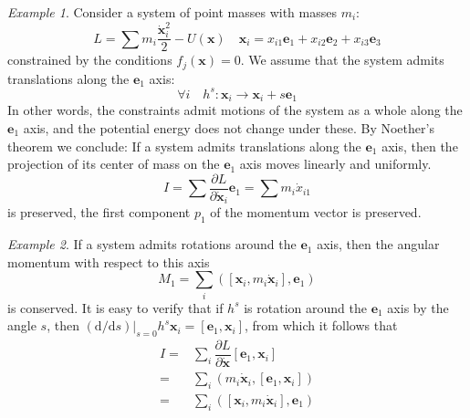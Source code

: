 \documentclass[conference]{IEEEtran}
\theoremstyle{definition}
\theoremstyle{remark}
\newtheorem{exmp}{Example}
\begin{document}
    \begin{exmp}
        Consider a system of point masses with masses $m_i$:
        \begin{equation*}
            L = \sum m_i \dfrac{\dot{\mathbf{x}}_i^2}2 - U(\mathbf{x}) \quad \mathbf{x}_i = x_{i1} \mathbf{e}_1 + x_{i2} \mathbf{e}_2 + x_{i3} \mathbf{e}_3
        \end{equation*}
        constrained by the conditions $f_j(\mathbf{x}) = 0$. We assume that the system admits translations along the $\mathbf{e}_1$ axis:
        \begin{equation*}
            \forall i \quad h^s: \mathbf{x}_i \to \mathbf{x}_i + s \mathbf{e}_1
        \end{equation*}
        In other words, the constraints admit motions of the system as a whole along the $\mathbf{e}_1$ axis, and the potential energy does not change under these. By Noether's theorem we conclude: If a system admits translations along the $\mathbf{e}_1$ axis, then the projection of its center of mass on the $\mathbf{e}_1$ axis moves linearly and uniformly.
        \begin{equation*}
            I = \sum \dfrac{\partial L}{\partial \dot{\mathbf{x}}_i} \mathbf{e}_1 = \sum m_i \dot{x}_{i1}
        \end{equation*}
        is preserved, the first component $p_1$ of the momentum vector is preserved.
    \end{exmp}

    \begin{exmp}
        If a system admits rotations around the $\mathbf{e}_1$ axis, then the angular momentum with respect to this axis
        \begin{equation*}
            M_1 = \sum_i \left( [\mathbf{x}_i, m_i\dot{\mathbf{x}}_i], \mathbf{e}_1 \right)
        \end{equation*}
        is conserved. It is easy to verify that if $h^s$ is rotation around the $\mathbf{e}_1$ axis by the angle $s$, then $(\mathrm{d} / \mathrm{d}s)|_{s = 0} h^s \mathbf{x}_i = [\mathbf{e}_1, \mathbf{x}_i]$, from which it follows that
        \begin{align*}
            I =& \sum_i \dfrac{\partial L}{\partial \dot{\mathbf{x}}} [\mathbf{e}_1, \mathbf{x}_i] \\
            =& \sum_i (m_i \dot{\mathbf{x}}_i, [\mathbf{e}_1, \mathbf{x}_i]) \\
            =& \sum_i \left( [\mathbf{x}_i, m_i\dot{\mathbf{x}}_i], \mathbf{e}_1 \right)
        \end{align*}
    \end{exmp}
\end{document}
